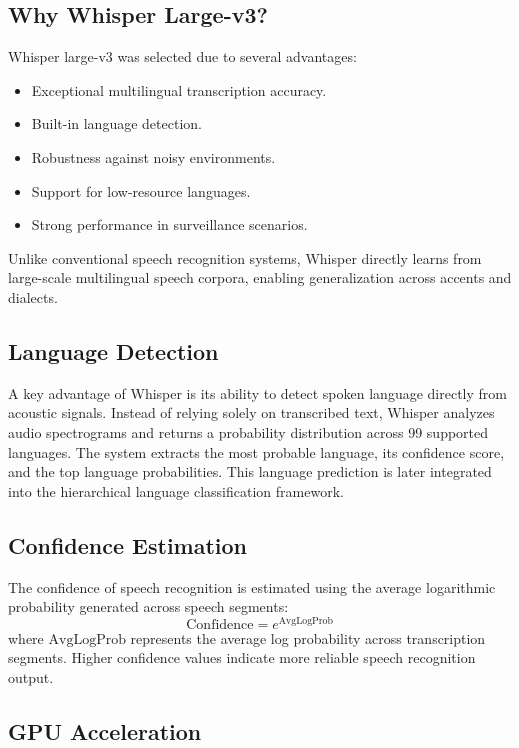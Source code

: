 \documentclass[12pt]{report}
\begin{document}
\subsection{Why Whisper Large-v3?}

Whisper large-v3 was selected due to several advantages:
\begin{itemize}
    \item Exceptional multilingual transcription accuracy.
    \item Built-in language detection.
    \item Robustness against noisy environments.
    \item Support for low-resource languages.
    \item Strong performance in surveillance scenarios.
\end{itemize}

Unlike conventional speech recognition systems, Whisper directly learns from large-scale multilingual speech corpora, enabling generalization across accents and dialects.

\subsection{Language Detection}

A key advantage of Whisper is its ability to detect spoken language directly from acoustic signals. Instead of relying solely on transcribed text, Whisper analyzes audio spectrograms and returns a probability distribution across 99 supported languages. The system extracts the most probable language, its confidence score, and the top language probabilities. This language prediction is later integrated into the hierarchical language classification framework.

\subsection{Confidence Estimation}

The confidence of speech recognition is estimated using the average logarithmic probability generated across speech segments:
\[
\text{Confidence} = e^{\text{AvgLogProb}}
\]
where $\text{AvgLogProb}$ represents the average log probability across transcription segments. Higher confidence values indicate more reliable speech recognition output.

\subsection{GPU Acceleration}
\end{document}
